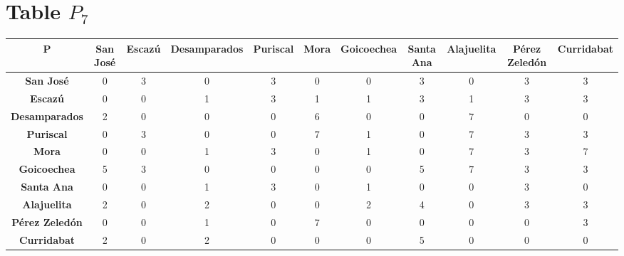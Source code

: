 \documentclass{article}
\begin{document}
\section{Table $P_{7}$}
\begin{center}
    \begin{tabular}{|c||c|c|c|c|c|c|c|c|c|c|}
        \hline
        \textbf{P} & \textbf{San José} & \textbf{Escazú} & \textbf{Desamparados} & \textbf{Puriscal} & \textbf{Mora} & \textbf{Goicoechea} & \textbf{Santa Ana} & \textbf{Alajuelita} & \textbf{Pérez Zeledón} & \textbf{Curridabat} \\
        \hline
        \hline
        \textbf{San José}& 0 & 3 & 0 & 3 & 0 & 0 & 3 & 0 & 3 & 3 \\
        \hline
        \textbf{Escazú}& 0 & 0 & 1 & 3 & 1 & 1 & 3 & 1 & 3 & 3 \\
        \hline
        \textbf{Desamparados}& 2 & 0 & 0 & 0 & 6 & 0 & 0 & \cellcolor[HTML]{D74894}$7$ & 0 & 0 \\
        \hline
        \textbf{Puriscal}& 0 & 3 & 0 & 0 & \cellcolor[HTML]{D74894}$7$ & 1 & 0 & \cellcolor[HTML]{D74894}$7$ & 3 & 3 \\
        \hline
        \textbf{Mora}& 0 & 0 & 1 & 3 & 0 & 1 & 0 & \cellcolor[HTML]{D74894}$7$ & 3 & \cellcolor[HTML]{D74894}$7$ \\
        \hline
        \textbf{Goicoechea}& 5 & 3 & 0 & 0 & 0 & 0 & 5 & \cellcolor[HTML]{D74894}$7$ & 3 & 3 \\
        \hline
        \textbf{Santa Ana}& 0 & 0 & 1 & 3 & 0 & 1 & 0 & 0 & 3 & 0 \\
        \hline
        \textbf{Alajuelita}& 2 & 0 & 2 & 0 & 0 & 2 & 4 & 0 & 3 & 3 \\
        \hline
        \textbf{Pérez Zeledón}& 0 & 0 & 1 & 0 & \cellcolor[HTML]{D74894}$7$ & 0 & 0 & 0 & 0 & 3 \\
        \hline
        \textbf{Curridabat}& 2 & 0 & 2 & 0 & 0 & 0 & 5 & 0 & 0 & 0 \\
        \hline
    \end{tabular}
\end{center}
\end{document}
